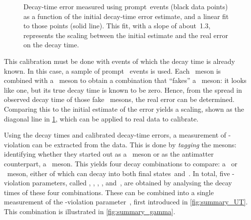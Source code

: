 %
\begin{figure}[hp] \centerfloat
    \caption{
        Decay-time error measured using prompt~\Dsmp events (black data points) as a function of the initial decay-time error estimate, and a linear fit to those points (solid line).
        This fit, with a slope of about~\num{1.3}, represents the scaling between the initial estimate and the real error on the decay time.}
    \label{fig:summary_resolution}
\end{figure}
%
This calibration must be done with events of which the decay time is already known.
In this case, a sample of prompt \Dsmp~events is used.
Each \Dsmp~meson is combined with a \Kpm~meson to obtain a combination that ``fakes'' a \Bs~meson: it looks like one, but its true decay time is known to be zero.
Hence, from the spread in observed decay time of those fake \Bs~mesons, the real error can be determined.
Comparing this to the initial estimate of the error yields a scaling, shown as the diagonal line in \cref{fig:summary_resolution}, which can be applied to real data to calibrate.

Using the decay times and calibrated decay-time errors, a measurement of \CP-violation can be extracted from the data.
This is done by \emph{tagging} the mesons: identifying whether they started out as a \Bs~meson or as the antimatter counterpart, a \Bsb~meson.
This yields four decay combinations to compare: a \Bs~or \Bsb~meson, either of which can decay into both final states~\DsmKp and~\DspKm.
In total, five \CP-violation parameters, called \Cpar, \Spar, \Sbpar, \Dpar, and~\Dbpar, are obtained by analysing the decay times of these four combinations.
These can be combined into a single measurement of the \CP-violation parameter~\CPgamma, first introduced in \cref{fig:summary_UT}.
This combination is illustrated in \cref{fig:summary_gamma}.

